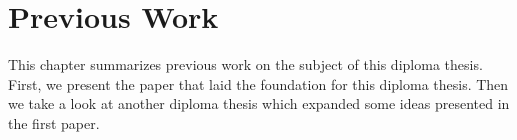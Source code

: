 \chapter{Previous Work}
\label{previous}

This chapter summarizes previous work on the subject of this diploma thesis.
First, we present the paper that laid the foundation for this diploma thesis.
Then we take a look at another diploma thesis which expanded some ideas presented in the first paper.



